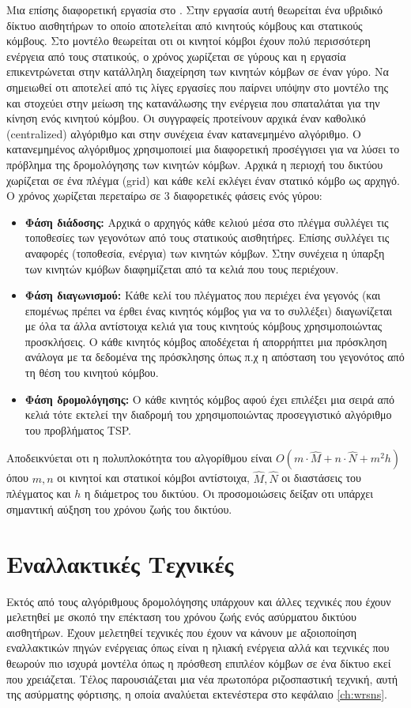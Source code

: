 Μια επίσης διαφορετική εργασία στο \cite{auction_energy_balance}. Στην εργασία αυτή θεωρείται ένα υβριδικό δίκτυο αισθητήρων το οποίο αποτελείται από κινητούς
κόμβους και στατικούς κόμβους. Στο μοντέλο θεωρείται οτι οι κινητοί κόμβοι έχουν πολύ περισσότερη ενέργεια από τους στατικούς, ο χρόνος χωρίζεται σε γύρους και η
εργασία επικεντρώνεται στην κατάλληλη διαχείρηση των κινητών κόμβων σε έναν γύρο. Να σημειωθεί οτι αποτελεί από τις λίγες εργασίες που παίρνει υπόψην στο μοντέλο της
και στοχεύει στην μείωση της κατανάλωσης την ενέργεια που σπαταλάται για την κίνηση ενός κινητού κόμβου. Οι συγγραφείς προτείνουν αρχικά έναν καθολικό (centralized)
αλγόριθμο και στην συνέχεια έναν κατανεμημένο αλγόριθμο. O κατανεμημένος αλγόριθμος χρησιμοποιεί μια διαφορετική προσέγγισει για να λύσει το πρόβλημα της
δρομολόγησης των κινητών κόμβων. Αρχικά η περιοχή του δικτύου χωρίζεται σε ένα πλέγμα (grid) και κάθε κελί εκλέγει έναν στατικό κόμβο ως αρχηγό. Ο χρόνος χωρίζεται
περεταίρω σε 3 διαφορετικές φάσεις ενός γύρου:
\begin{itemize}
\item \textbf{Φάση διάδοσης:} Αρχικά ο αρχηγός κάθε κελιού μέσα στο πλέγμα συλλέγει τις τοποθεσίες των γεγονότων από τους στατικούς αισθητήρες. Επίσης συλλέγει τις
αναφορές (τοποθεσία, ενέργια) των κινητών κόμβων. Στην συνέχεια η ύπαρξη των κινητών κμόβων διαφημίζεται από τα κελιά που τους περιέχουν.
\item \textbf{Φάση διαγωνισμού:} Κάθε κελί του πλέγματος που περιέχει ένα γεγονός (και επομένως πρέπει να έρθει ένας κινητός κόμβος για να το συλλέξει) διαγωνίζεται
με όλα τα άλλα αντίστοιχα κελιά για τους κινητούς κόμβους χρησιμοποιώντας προσκλήσεις. Ο κάθε κινητός κόμβος αποδέχεται ή απορρήπτει μια πρόσκληση ανάλογα με τα
δεδομένα της πρόσκλησης όπως π.χ η απόσταση του γεγονότος από τη θέση του κινητού κόμβου.
\item \textbf{Φάση δρομολόγησης:} Ο κάθε κινητός κόμβος αφού έχει επιλέξει μια σειρά από κελιά τότε εκτελεί την διαδρομή του χρησιμοποιώντας προσεγγιστικό αλγόριθμο
του προβλήματος TSP.
\end{itemize}
Αποδεικνύεται οτι η πολυπλοκότητα του αλγορίθμου είναι $O(m\cdot\hat{M} + n\cdot\hat{N} + m^{2}h)$ όπου $m,n$ οι κινητοί και στατικοί κόμβοι αντίστοιχα, $\hat{M},
\hat{N}$ οι διαστάσεις του πλέγματος και $h$ η διάμετρος του δικτύου. Οι προσομοιώσεις δείξαν οτι υπάρχει σημαντική αύξηση του χρόνου ζωής του δικτύου.



\section{Εναλλακτικές Τεχνικές} %
Εκτός από τους αλγόριθμους δρομολόγησης υπάρχουν και άλλες τεχνικές που έχουν μελετηθεί με σκοπό την επέκταση του χρόνου ζωής ενός ασύρματου δικτύου αισθητήρων.
Έχουν μελετηθεί τεχνικές που έχουν να κάνουν με αξοιοποίηση εναλλακτικών πηγών ενέργειας όπως είναι η ηλιακή ενέργεια αλλά και τεχνικές που θεωρούν πιο ισχυρά μοντέλα
όπως η πρόσθεση επιπλέον κόμβων σε ένα δίκτυο εκεί που χρειάζεται. Τέλος παρουσιάζεται μια νέα πρωτοπόρα ριζοσπαστική τεχνική, αυτή της ασύρματης
φόρτισης, η οποία αναλύεται εκτενέστερα στο κεφάλαιο \ref{ch:wrsns}.

